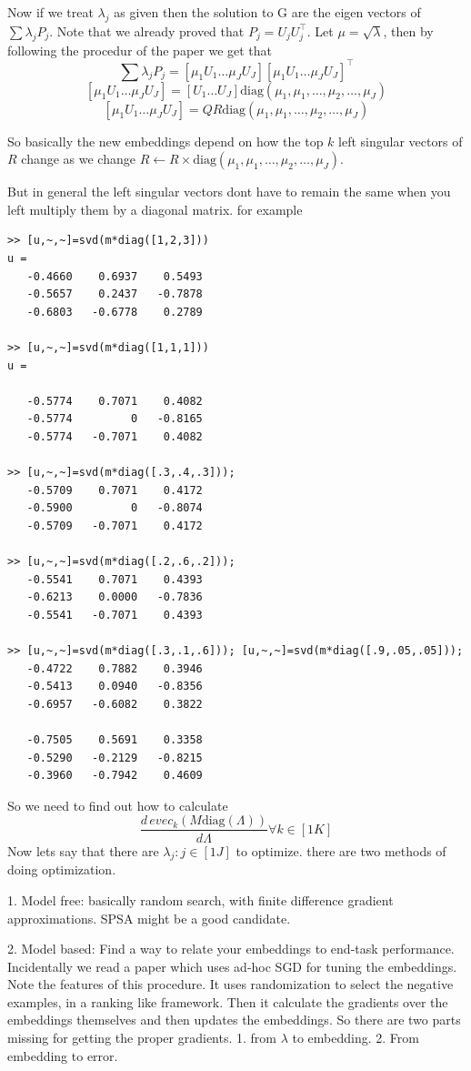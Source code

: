 \documentclass[11pt]{article}
\begin{document}
Now if we treat $\lambda_j$ as given then the solution to G are the
eigen vectors of $\sum \lambda_j P_j$. Note that we already proved
that $P_j = U_j U_j^\top$. Let $\mu = \sqrt{\lambda}$, then by following the procedur of the paper
we get that
$$\sum \lambda_j P_j = [ \mu_1 U_1 \ldots \mu_J U_J][ \mu_1 U_1 \ldots
  \mu_J U_J]^\top$$
$$[ \mu_1 U_1 \ldots \mu_J U_J]  = [ U_1 \ldots U_J]
\text{diag}(\mu_1,\mu_1,\ldots, \mu_2, \ldots, \mu_J)$$
$$[ \mu_1 U_1 \ldots \mu_J U_J]  = QR\text{diag}(\mu_1,\mu_1,\ldots, \mu_2, \ldots, \mu_J)$$

So basically the new embeddings depend on how the top $k$ left singular
vectors of $R$ change as we change $R \leftarrow
R \times \text{diag}(\mu_1,\mu_1,\ldots, \mu_2, \ldots, \mu_J)$.

But in general the left singular vectors dont have to remain the same when you
left multiply them by a diagonal matrix. for example
\begin{verbatim}
>> [u,~,~]=svd(m*diag([1,2,3]))
u =
   -0.4660    0.6937    0.5493
   -0.5657    0.2437   -0.7878
   -0.6803   -0.6778    0.2789

>> [u,~,~]=svd(m*diag([1,1,1]))
u =

   -0.5774    0.7071    0.4082
   -0.5774         0   -0.8165
   -0.5774   -0.7071    0.4082

>> [u,~,~]=svd(m*diag([.3,.4,.3])); 
   -0.5709    0.7071    0.4172
   -0.5900         0   -0.8074
   -0.5709   -0.7071    0.4172

>> [u,~,~]=svd(m*diag([.2,.6,.2]));
   -0.5541    0.7071    0.4393
   -0.6213    0.0000   -0.7836
   -0.5541   -0.7071    0.4393

>> [u,~,~]=svd(m*diag([.3,.1,.6])); [u,~,~]=svd(m*diag([.9,.05,.05]));
   -0.4722    0.7882    0.3946
   -0.5413    0.0940   -0.8356
   -0.6957   -0.6082    0.3822

   -0.7505    0.5691    0.3358
   -0.5290   -0.2129   -0.8215
   -0.3960   -0.7942    0.4609
\end{verbatim}

So we need to find out how to calculate
$$ \frac{d\, evec_k(M \text{diag}(\Lambda))}{d \Lambda} \forall k \in
[1 K]$$
Now lets say that there are $\lambda_j: j \in [1 J]$ to 
optimize. there are two methods of doing optimization.

1. Model free: basically random search, with finite difference
gradient approximations. SPSA might be a good candidate.

2. Model based: Find a way to relate your embeddings to end-task
performance. Incidentally we read a paper which uses ad-hoc SGD for
tuning the embeddings. Note the features of this procedure. It uses
randomization to select the negative examples, in a ranking like
framework. Then it calculate the gradients over the embeddings
themselves and then updates the embeddings. So there are two parts
missing for getting the proper gradients. 1. from $\lambda$ to
embedding. 2. From embedding to error.
\end{document}

